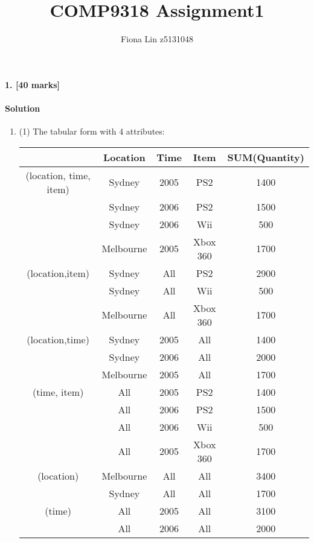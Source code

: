 \documentclass[a4paper]{scrartcl}
\title{COMP9318 Assignment1}
\author{Fiona Lin z5131048}
\begin{document}
\maketitle

\paragraph{1. [40 marks]}
\label{sec:Question 1}
\paragraph{Solution}
\begin{enumerate}[label=\arabic*)]
  \item  (1) The tabular form with 4 attributes:\\
  \begin{tabular}{c |c | c | c | c}
    \hline
 & Location & Time & Item & SUM(Quantity)  \\
    \hline
    (location, time, item) & Sydney & 2005 & PS2 & 1400\\
    \hline
 & Sydney & 2006 & PS2 & 1500      \\
    \hline
 & Sydney & 2006 & Wii & 500 \\
    \hline
 & Melbourne & 2005 & Xbox 360 & 1700 \\
    \hline
 (location,item) & Sydney & All & PS2 & 2900 \\
    \hline
 & Sydney & All & Wii & 500\\
    \hline
 & Melbourne & All & Xbox 360 & 1700\\
    \hline
    (location,time) & Sydney & 2005 & All & 1400\\
    \hline
 & Sydney & 2006 & All & 2000\\
    \hline
 & Melbourne & 2005 & All & 1700\\
    \hline
    (time, item) & All & 2005 & PS2 & 1400\\
    \hline
 & All & 2006 & PS2 & 1500\\
    \hline
 & All & 2006 & Wii & 500\\
    \hline
 & All & 2005 & Xbox 360 & 1700 \\
    \hline
    (location) & Melbourne & All & All & 3400\\
    \hline
 & Sydney & All & All & 1700 \\
    \hline
    (time) & All & 2005 & All & 3100\\
    \hline
 & All & 2006 & All & 2000 \\
    \hline

\end{tabular}
\end{enumerate}
\end{document}
